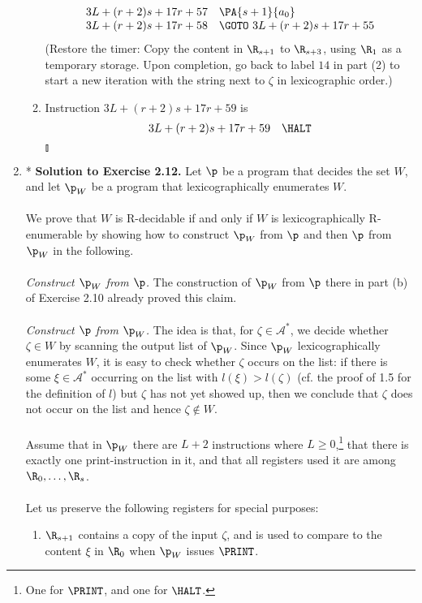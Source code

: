 \begin{enumerate}[1.]
\begin{enumerate}[(1)]
\[\begin{array}{rl}
3L + (r + 2)s + 17r + 57 & \PA{s + 1}{a_0} \cr
3L + (r + 2)s + 17r + 58 & \GOTO \ 3L + (r + 2)s + 17r + 55
\end{array}
\]
(Restore the timer: Copy the content in $\R_{s + 1}$ to $\R_{s + 3}$, using $\R_1$ as a temporary storage. Upon completion, go back to label $14$ in part (2) to start a new iteration with the string next to $\zeta$ in lexicographic order.)
\item Instruction $3L + (r + 2)s + 17r + 59$ is
\[
\begin{array}{rl}
3L + (r + 2)s + 17r + 59 & \HALT
\end{array}
\]\nolinebreak\hfill$\talloblong$
\end{enumerate}
%
\item* \textbf{Solution to Exercise 2.12.} Let $\p$ be a program that decides the set $W$, and let $\p_W$ be a program that lexicographically enumerates $W$.\\
\ \\
We prove that $W$ is R-decidable if and only if $W$ is lexicographically R-enumerable by showing how to construct $\p_W$ from $\p$ and then $\p$ from $\p_W$ in the following.\\
\ \\
\emph{Construct $\p_W$ from $\p$.} The construction of $\p_W$ from $\p$ there in part (b) of Exercise 2.10 already proved this claim.\\
\ \\
\emph{Construct $\p$ from $\p_W$.} The idea is that, for $\zeta \in \mathcal{A}^\ast$, we decide whether $\zeta \in W$ by scanning the output list of $\p_W$. Since $\p_W$ lexicographically enumerates $W$, it is easy to check whether $\zeta$ occurs on the list: if there is some $\xi \in \mathcal{A}^\ast$ occurring on the list with $l(\xi) > l(\zeta)$ (cf. the proof of 1.5 for the definition of $l$) but $\zeta$ has not yet showed up, then we conclude that $\zeta$ does not occur on the list and hence $\zeta \not\in W$.\\
\ \\
Assume that in $\p_W$ there are $L + 2$ instructions where $L \geq 0$,\footnote{One for $\PRINT$, and one for $\HALT$.} that there is exactly one print-instruction in it, and that all registers used it are among $\R_0, \ldots, \R_s$.\\
\ \\
Let us preserve the following registers for special purposes:
\begin{enumerate}[1)]
\item $\R_{s + 1}$ contains a copy of the input $\zeta$, and is used to compare to the content $\xi$ in $\R_0$ when $\p_W$ issues $\PRINT$.

\end{enumerate}
\end{enumerate}
